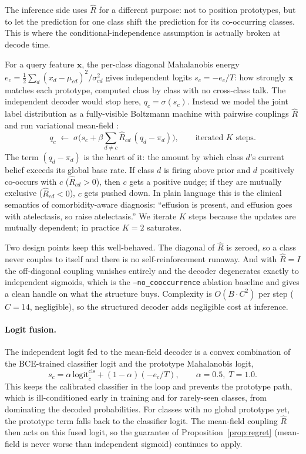 \documentclass[11pt,a4paper]{article}
\theoremstyle{definition}
\newcommand{\Rhat}{\widehat{R}}
\begin{document}
The inference side uses $\Rhat$ for a different purpose: not to position prototypes, but to let the prediction for one class shift the prediction for its co-occurring classes. This is where the conditional-independence assumption is actually broken at decode time.

For a query feature $\mathbf{x}$, the per-class diagonal Mahalanobis energy $e_c=\tfrac12\sum_d (x_d-\mu_{cd})^{2}/\sigma_{cd}^{2}$ gives independent logits $s_c=-e_c/T$: how strongly $\mathbf{x}$ matches each prototype, computed class by class with no cross-class talk. The independent decoder would stop here, $q_c=\sigma(s_c)$. Instead we model the joint label distribution as a fully-visible Boltzmann machine with pairwise couplings $\Rhat$ and run variational mean-field \citep{wainwright2008variational}:
\begin{equation}
q_c\;\leftarrow\;\sigma\!\Big(s_c+\beta\sum_{d\neq c}\Rhat_{cd}\,(q_d-\pi_d)\Big),\qquad\text{iterated }K\text{ steps.}
\label{eq:meanfield}
\end{equation}
The term $(q_d-\pi_d)$ is the heart of it: the amount by which class $d$'s current belief exceeds its global base rate. If class $d$ is firing above prior and $d$ positively co-occurs with $c$ ($\Rhat_{cd}>0$), then $c$ gets a positive nudge; if they are mutually exclusive ($\Rhat_{cd}<0$), $c$ gets pushed down. In plain language this is the clinical semantics of comorbidity-aware diagnosis: ``effusion is present, and effusion goes with atelectasis, so raise atelectasis.'' We iterate $K$ steps because the updates are mutually dependent; in practice $K=2$ saturates.

Two design points keep this well-behaved. The diagonal of $\Rhat$ is zeroed, so a class never couples to itself and there is no self-reinforcement runaway. And with $\Rhat=I$ the off-diagonal coupling vanishes entirely and the decoder degenerates exactly to independent sigmoids, which is the \texttt{--no\_cooccurrence} ablation baseline and gives a clean handle on what the structure buys. Complexity is $O(B\cdot C^{2})$ per step ($C=14$, negligible), so the structured decoder adds negligible cost at inference.

\paragraph{Logit fusion.} The independent logit fed to the mean-field decoder is a convex combination of the BCE-trained classifier logit and the prototype Mahalanobis logit,
\begin{equation}
s_c=\alpha\,\mathrm{logit}_c^{\mathrm{cls}}+(1-\alpha)(-e_c/T),\qquad \alpha=0.5,\;T=1.0.
\label{eq:fusion}
\end{equation}
This keeps the calibrated classifier in the loop and prevents the prototype path, which is ill-conditioned early in training and for rarely-seen classes, from dominating the decoded probabilities. For classes with no global prototype yet, the prototype term falls back to the classifier logit. The mean-field coupling $\Rhat$ then acts on this fused logit, so the guarantee of Proposition~\ref{prop:regret} (mean-field is never worse than independent sigmoid) continues to apply.
\end{document}
